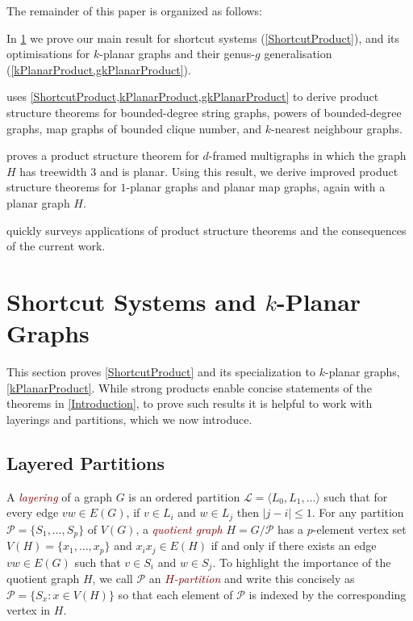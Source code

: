 \documentclass{patmorin}
\theoremstyle{plain}
\theoremstyle{definition}
\newcommand{\defin}[1]{\textcolor{Maroon}{\emph{#1}}}
\newcommand{\PP}{\mathcal{P}}
\renewcommand{\leq}{\leqslant}
\begin{document}
The remainder of this paper is organized as follows:
\begin{compactitem}
  \item In \cref{Structure} we prove our main result for shortcut systems (\cref{ShortcutProduct}), and its optimisations for $k$-planar graphs and their genus-$g$ generalisation (\cref{kPlanarProduct,gkPlanarProduct}).
  \item {} uses \cref{ShortcutProduct,kPlanarProduct,gkPlanarProduct} to derive product structure theorems for bounded-degree string graphs, powers of bounded-degree graphs, map graphs of bounded clique number, and $k$-nearest neighbour graphs.
  \item {} proves a product structure theorem for $d$-framed multigraphs in which the graph $H$ has treewidth $3$ and is planar.  Using this result, we derive improved product structure theorems for $1$-planar graphs and planar map graphs, again with a planar graph $H$.
  \item {} quickly surveys applications of product structure theorems and the consequences of the current work.
\end{compactitem}




\section{\boldmath Shortcut Systems and $k$-Planar Graphs}
\label{Structure}

This section proves \cref{ShortcutProduct} and its specialization to $k$-planar graphs, \cref{kPlanarProduct}. While strong products enable concise statements of the theorems in \cref{Introduction}, to prove such results it is helpful to work with layerings and partitions, which we now introduce.

\subsection{Layered Partitions}

A \defin{layering} of a graph $G$ is an ordered partition $\mathcal{L}=\langle L_0,L_1,\ldots\rangle $ such that for every edge $vw\in E(G)$, if $v\in L_i$ and $w\in L_j$ then $|j-i|\leq 1$.  For any partition $\PP=\{S_1,\ldots,S_p\}$ of $V(G)$, a \defin{quotient graph} $H=G/\PP$ has a $p$-element vertex set $V(H)=\{x_1,\ldots,x_p\}$ and $x_ix_j\in E(H)$ if and only if there exists an edge $vw\in E(G)$ such that $v\in S_i$ and $w\in S_j$. To highlight the importance of the quotient graph $H$, we call $\PP$ an \defin{$H$-partition} and write this concisely as $\PP=\{S_x : x\in V(H)\}$ so that each element of $\PP$ is indexed by the corresponding vertex in $H$.
\end{document}
